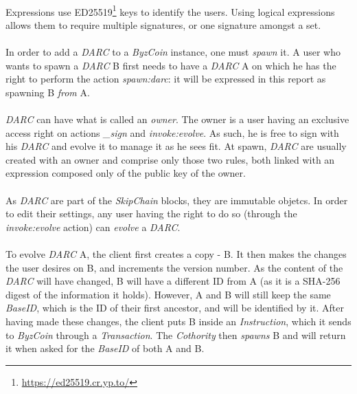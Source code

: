 \paragraph{}

Expressions use ED25519\footnote{\url{https://ed25519.cr.yp.to/}} keys to identify the users. Using logical expressions allows them to require multiple signatures, or one signature amongst a set.

\paragraph{}

In order to add a \textit{DARC} to a \textit{ByzCoin} instance, one must \textit{spawn} it. A user who wants to spawn a \textit{DARC} B first needs to have a \textit{DARC} A on which he has the right to perform the action \textit{spawn:darc}: it will be expressed in this report as spawning B \textit{from} A.

\paragraph{}

\textit{DARC} can have what is called an \textit{owner}. The owner is a user having an exclusive access right on actions \textit{\_sign} and \textit{invoke:evolve}. As such, he is free to sign with his \textit{DARC} and evolve it to manage it as he sees fit. At spawn, \textit{DARC} are usually created with an owner and comprise only those two rules, both linked with an expression composed only of the public key of the owner.

\paragraph{}

As \textit{DARC} are part of the \textit{SkipChain} blocks, they are immutable objetcs. In order to edit their settings, any user having the right to do so (through the \textit{invoke:evolve} action) can \textit{evolve} a \textit{DARC}. 

\paragraph{}

To evolve \textit{DARC} A, the client first creates a copy - B. It then makes the changes the user desires on B, and increments the version number. As the content of the \textit{DARC} will have changed, B will have a different ID from A (as it is a SHA-256 digest of the information it holds). However, A and B will still keep the same \textit{BaseID}, which is the ID of their first ancestor, and will be identified by it. After having made these changes, the client puts B inside an \textit{Instruction}, which it sends to \textit{ByzCoin} through a \textit{Transaction}. The \textit{Cothority} then \textit{spawns} B and will return it when asked for the \textit{BaseID} of both A and B.


